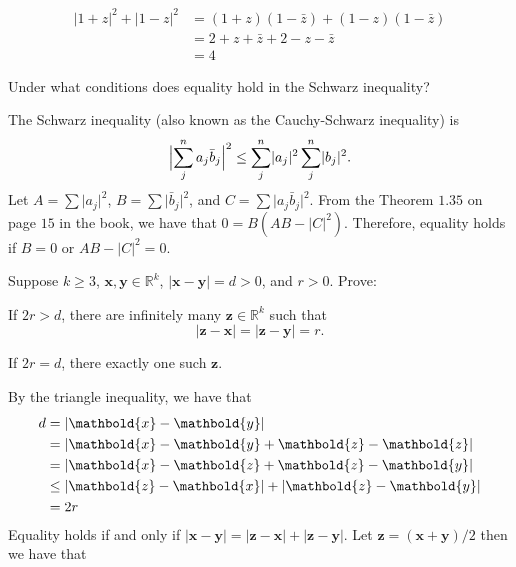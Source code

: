 \begin{exercise}
  \begin{align*}
    \lvert 1 + z\rvert^2 + \lvert 1 - z\rvert^2
    & = (1 + z)(1 - \bar{z}) + (1 - z)(1 - \bar{z})\\
    & = 2 + z + \bar{z} + 2 - z - \bar{z}\\
    & = 4
  \end{align*}
\item
  Under what conditions does equality hold in the Schwarz inequality?
  \par\smallskip
  The Schwarz inequality (also known as the Cauchy-Schwarz inequality) is
  \[
  \Bigl\lvert\sum_j^n a_j\bar{b}_j\Bigr\rvert^2\leq\sum_j^n\lvert a_j\rvert^2
  \sum_j^n\lvert b_j\rvert^2.
  \]
  Let \(A = \sum\lvert a_j\rvert^2\), \(B = \sum\lvert \bar{b}_j\rvert^2\), and
  \(C = \sum\lvert a_j\bar{b}_j\rvert^2\).
  From the Theorem \(1.35\) on page \(15\) in the book, we have that 
  \(0 = B(AB - \lvert C\rvert^2)\).
  Therefore, equality holds if \(B = 0\) or \(AB - \lvert C\rvert^2 = 0\).
\item
  Suppose \(k\geq 3\), \(\mathbold{x},\mathbold{y}\in\mathbb{R}^k\),
  \(\lvert\mathbold{x} - \mathbold{y}\rvert = d > 0\), and \(r > 0\).
  Prove:
  \begin{exercise}[label = (\alph*)]
  \item
    If \(2r > d\), there are infinitely many \(\mathbold{z}\in\mathbb{R}^k\)
    such that
    \[
    \lvert\mathbold{z} - \mathbold{x}\rvert =
    \lvert\mathbold{z} - \mathbold{y}\rvert = r.
    \]
  \item
    If \(2r = d\), there exactly one such \(\mathbold{z}\).
    \par\smallskip
    By the triangle inequality, we have that
    \[
      \begin{aligned}
    	     d &= \lvert\mathbold{x} - \mathbold{y}\rvert\notag \\
	        &= \lvert\mathbold{x} - \mathbold{y} + \mathbold{z} - \mathbold{z}\rvert\notag \\
	        &= \lvert\mathbold{x} - \mathbold{z} + \mathbold{z} - \mathbold{y}\rvert\notag \\
	        & \leq\lvert\mathbold{z} - \mathbold{x}\rvert + \lvert\mathbold{z} - \mathbold{y}\rvert\notag \\
	        &= 2r\notag
      \end{aligned}
    \]
    Equality holds if and only if \(\lvert\mathbold{x} - \mathbold{y}\rvert = 
    \lvert\mathbold{z} - \mathbold{x}\rvert + \lvert\mathbold{z} - \mathbold{y}\rvert\).
    Let \(\mathbold{z} = (\mathbold{x} + \mathbold{y}) / 2\) then we have that

\end{exercise}
\end{exercise}
